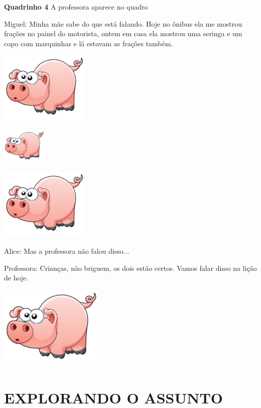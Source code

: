 \documentclass[a4,12pt]{book}
\begin{document}
\begin{imagem*}[breakable]{}{}
  {\bf Quadrinho 4}  
  A professora aparece no quadro  
  
  Miguel: Minha mãe sabe do que está falando. Hoje no ônibus ela me mostrou frações no painel do motorista, ontem em casa ela mostrou uma seringa e um copo com marquinhas e lá estavam as frações também.  
  
    \includegraphics[width=120pt, keepaspectratio]{pig}  
  
    \includegraphics[width=60pt, keepaspectratio]{pig}  
  
    \includegraphics[width=120pt, keepaspectratio]{pig}  
  
  
  Alice: Mas a professora não falou disso...  
  
  Professora: Crianças, não briguem, os dois estão certos. Vamos falar disso na lição de hoje.  
  
\end{imagem*}




\includegraphics[width=\textwidth,height=4cm, keepaspectratio]{pig}


\section*{ EXPLORANDO O ASSUNTO }
\end{document}
